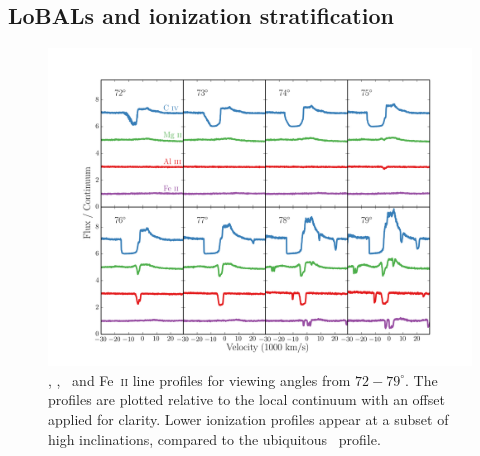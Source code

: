 \documentclass[useAMS,usenatbib]{mn2e_x}
\begin{document}



\subsection{LoBALs and ionization stratification}

\begin{figure} %
\centering
\includegraphics[width=1.0\textwidth]{figures/c4_angles.png}
\caption
{
\civ , \mg , \al\ and Fe~\textsc{ii} line profiles for viewing angles
from $72-79^\circ$. The profiles are plotted relative to the local
continuum with an offset applied for clarity. Lower ionization
profiles appear at a subset of high inclinations, compared
to the ubiquitous \civ\ profile.
}
\label{fig:lobal}
\end{figure} %
\end{document}
